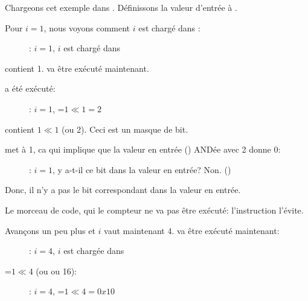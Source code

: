 ﻿\clearpage
\mysubparagraph{\olly}
\myindex{\olly}

Chargeons cet exemple dans \olly.
Définissons la valeur d'entrée à .

Pour $i=1$, nous voyons comment $i$ est chargé dans \ECX:

\begin{figure}[H]
\centering
{}
\caption{\olly: $i=1$, $i$ est chargé dans \ECX}
\label{fig:shifts_olly1_1}
\end{figure}

\EDX contient 1. \SHL va être exécuté maintenant.

\clearpage
\SHL a été exécuté:

\begin{figure}[H]
\centering
{}
\caption{\olly: $i=1$, \EDX=$1 \ll 1=2$}
\label{fig:shifts_olly1_2}
\end{figure}

\EDX contient $1 \ll 1$ (ou 2). Ceci est un masque de bit.

\clearpage
\AND met \ZF à 1, ca qui implique que la valeur en entrée () ANDée
avec 2 donne 0:

\begin{figure}[H]
\centering
{}
\caption{\olly: $i=1$, 
y a-t-il ce bit dans la valeur en entrée? Non. ()}
\label{fig:shifts_olly1_3}
\end{figure}

Donc, il n'y a pas le bit correspondant dans la valeur en entrée.

Le morceau de code, qui  le compteur ne va pas être
exécuté:
l'instruction \JZ l'évite.

\clearpage
Avançons un peu plus et $i$ vaut maintenant 4.
\SHL va être exécuté maintenant:

\begin{figure}[H]
\centering
{}
\caption{\olly: $i=4$, $i$ est chargée dans \ECX}
\label{fig:shifts_olly4_1}
\end{figure}

\clearpage
\EDX=$1 \ll 4$ (ou  ou 16):

\begin{figure}[H]
\centering
{}
\caption{\olly: $i=4$, \EDX=$1 \ll 4=0x10$}
\label{fig:shifts_olly4_2}
\end{figure}

